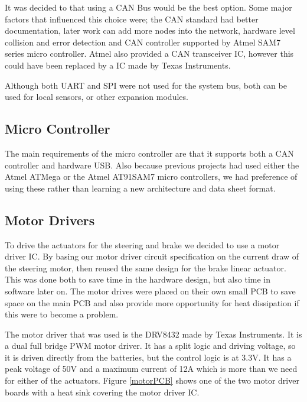   It was decided to that using a CAN Bus would be the best option. Some major
  factors that influenced this choice were; the CAN standard had better
  documentation, later work can add more nodes into the network, hardware level
  collision and error detection and CAN controller supported by Atmel SAM7
  series micro controller. Atmel also provided a CAN transceiver
  IC\cite{ata666}, however this could have been replaced by a IC made by Texas
  Instruments\cite{ti-can-trans}.

  Although both UART and SPI were not used for the system bus, both can be used
  for local sensors, or other expansion modules.

  \subsection{Micro Controller}
  The main requirements of the micro controller are that it supports both a CAN
  controller and hardware USB. Also because previous projects had used either
  the Atmel ATMega or the Atmel AT91SAM7 micro controllers, we had preference
  of using these rather than learning a new architecture and data sheet format.

  \subsection{Motor Drivers}
  To drive the actuators for the steering and brake we decided to use a motor
  driver IC. By basing our motor driver circuit specification on the current
  draw of the steering motor, then reused the same design for the brake linear
  actuator. This was done both to save time in the hardware design, but also
  time in software later on\cite{Looman_2011}. The motor drives were placed on their own small PCB
  to save space on the main PCB and also provide more opportunity for heat
  dissipation if this were to become a problem. 

  The motor driver that was used is the DRV8432 made by Texas
  Instruments\cite{ti-motor-driver}. It is a dual full bridge PWM motor driver.
  It has a split logic and driving voltage, so it is driven directly from the
  batteries, but the control logic is at 3.3V. It has a peak voltage of 50V and
  a maximum current of 12A which is more than we need for either of the
  actuators. Figure \ref{motorPCB} shows one of the two motor driver boards with
  a heat sink covering the motor driver IC.

